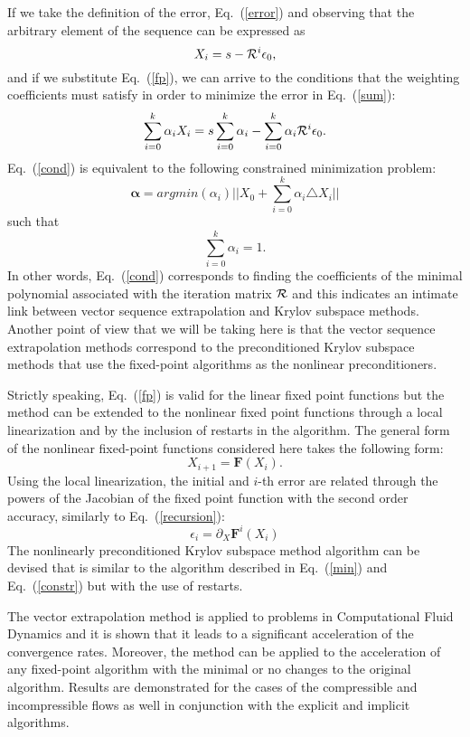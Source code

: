 \documentclass{report}
\begin{document}
If we take the definition of the error, Eq.~(\ref{error}) and
observing that the arbitrary element of the sequence can be
expressed as
\begin{equation}
X_i = s - {\cal R}^i \epsilon_0,
\end{equation}
and if we substitute Eq.~(\ref{fp}), we can arrive to the
conditions that the weighting coefficients must satisfy in order
to minimize the error in Eq.~(\ref{sum}):
\begin{equation}\label{cond}
\sum_{i=0}^{k} \alpha_i X_i = s \sum_{i = 0}^k \alpha_i -
\sum_{i=0}^{k} \alpha_i {\cal R}^i \epsilon_0.
\end{equation}
Eq.~(\ref{cond}) is equivalent to the following constrained
minimization problem:
\begin{equation}\label{min}
\mathbf{\alpha} = argmin(\alpha_i)
|| X_0 + \sum_{i=0}^k \alpha_i \triangle X_i ||
\end{equation}
such that
\begin{equation}\label{constr}
\sum_{i = 0}^k \alpha_i = 1.
\end{equation}
In other words, Eq.~(\ref{cond}) corresponds to finding the
coefficients of the minimal polynomial associated with the
iteration matrix ${\cal R}$ and this indicates an intimate link
between vector sequence extrapolation and Krylov subspace
methods. Another point of view that we will be taking here is
that the vector sequence extrapolation methods correspond to the
preconditioned Krylov subspace methods that use the fixed-point
algorithms as the nonlinear preconditioners.

Strictly speaking, Eq.~(\ref{fp}) is valid for the linear fixed
point functions but the method can be extended to the nonlinear
fixed point functions through a local linearization and by the
inclusion of restarts in the algorithm. The general form of
the nonlinear fixed-point functions considered here takes the
following form:
\begin{equation}
X_{i+1} = \mathbf{F}\left(X_i\right).
\end{equation}
Using the local linearization, the initial and $i$-th error are
related through the powers of the Jacobian of the fixed point
function with the second order accuracy, similarly to
Eq.~(\ref{recursion}):
\begin{equation}
\epsilon_i = \partial_X \mathbf{F}^i\left(X_i\right)
\end{equation}
The nonlinearly preconditioned Krylov subspace method algorithm
can be devised that is similar to the algorithm described in
Eq.~(\ref{min}) and Eq.~(\ref{constr}) but with the use of
restarts.

The vector extrapolation method is applied to problems in
Computational Fluid Dynamics and it is shown that it leads to a
significant acceleration of the convergence rates. Moreover, the
method can be applied to the acceleration of any fixed-point
algorithm with the minimal or no changes to the original
algorithm. Results are demonstrated for the cases of the
compressible and incompressible flows as well in conjunction with
the explicit and implicit algorithms.
\end{document}
